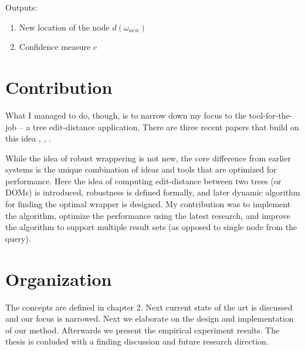 Outputs: 

\begin{enumerate}
	\item New location of the node $d(\omega_{new})$
	\item Confidence measure $c$
\end{enumerate}


\section{Contribution}


What I managed to do, though, is to narrow down my focus to the tool-for-the-job – a tree edit-distance application. There are three recent papers that build on this idea \cite{DBLP:conf/sigmod/DalviBS09}, \cite{DBLP:journals/pvldb/ParameswaranDGR11}, \cite{DBLP:conf/wism/LiuWYL12}.

While the idea of robust wrappering is not new, the core difference from earlier systems is the unique combination of ideas and tools that are optimized for performance.
Here the idea of computing edit-distance between two trees (or DOMs) is introduced, robustness is defined formally, and later dynamic algorithm for finding the optimal wrapper is designed. My contribution was to implement the algorithm, optimize the performance using the latest research, and improve the algorithm to support multiple result sets (as opposed to single node from the query).


\section{Organization}

The concepts are defined in chapter 2. Next current state of the art is discussed and our focus is narrowed. Next we elaborate on the design and implementation of our method. Afterwards we present the empirical experiment results. The thesis is conluded with a finding discussion and future research direction.



